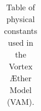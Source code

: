\documentclass{article}%
\begin{document}
\begin{table}[H]
\begin{tabular}{|p{1.5cm}|p{6cm}|p{2.5cm}|p{2cm}|p{2cm}|}
    \end{tabular}
    \caption{Table of physical constants used in the Vortex Æther Model (VAM).}
    \label{tab:physical_constants}
\end{table}
%
\small%
\end{document}

